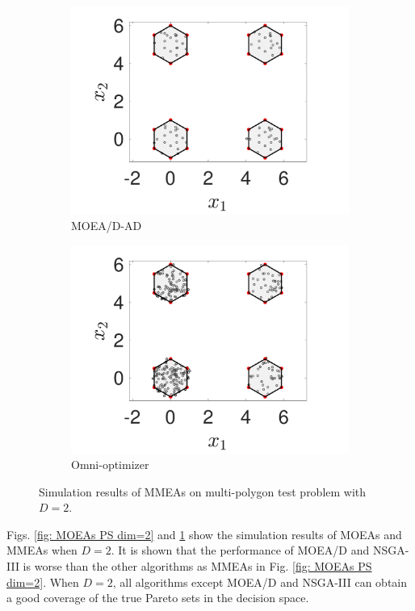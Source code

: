 \documentclass[conference]{IEEEtran}
\begin{document}
\begin{figure}[htbp]
    \begin{subfigure}[b]{.24\textwidth}
    \includegraphics[width=\linewidth]{Section5/dim2/PS/MOEADAD}
    \caption{MOEA/D-AD}
    \end{subfigure}
    \begin{subfigure}[b]{.24\textwidth}
    \includegraphics[width=\linewidth]{Section5/dim2/PS/OmniOptimizer}
    \caption{Omni-optimizer}
    \end{subfigure}
    \caption{Simulation results of MMEAs on multi-polygon test problem with $D=2$.}
    \label{fig: MMEAs PS dim=2}
\end{figure}

Figs. \ref{fig: MOEAs PS dim=2} and \ref{fig: MMEAs PS dim=2} show the simulation results of MOEAs and MMEAs when $D=2$. It is shown that the performance of MOEA/D and NSGA-III is worse than the other algorithms as MMEAs in Fig. \ref{fig: MOEAs PS dim=2}. When $D=2$, all algorithms except MOEA/D and NSGA-III can obtain a good coverage of the true Pareto sets in the decision space.
\end{document}
